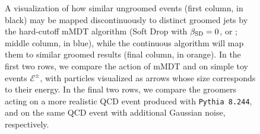\begin{figure}[tp]
{
}
\caption{
A visualization of how similar ungroomed events (first column, in black) may be mapped discontinuously to distinct groomed jets by the hard-cutoff mMDT algorithm (Soft Drop with \(\beta_{\rm SD} = 0\), or ; middle column, in blue), while the continuous  algorithm will map them to similar groomed results (final column, in orange).
%
In the first two rows, we compare the action of mMDT and  on simple toy events \(\mathcal{E}^\pm\), with particles visualized as arrows whose size corresponds to their energy.
%
In the final two rows, we compare the groomers acting on a more realistic QCD event produced with \texttt{Pythia 8.244}, and on the same QCD event with additional Gaussian noise, respectively.
}
\label{fig:intro_visual}
\end{figure}


